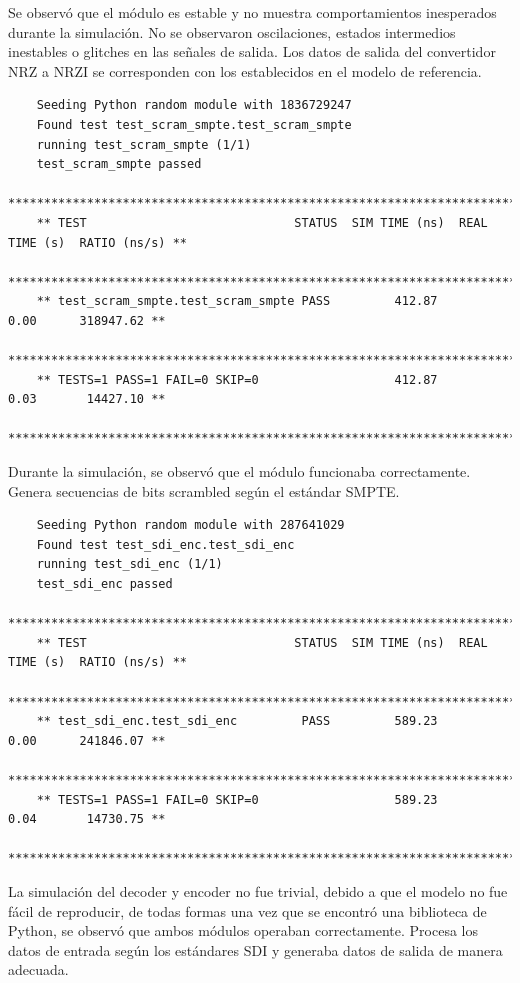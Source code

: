   Se observó que el módulo es estable y no muestra comportamientos inesperados
  durante la simulación. No se observaron oscilaciones, estados intermedios
  inestables o glitches en las señales de salida. Los datos de salida del
  convertidor NRZ a NRZI se corresponden con los establecidos en el modelo de
  referencia.

  {\scriptsize\begin{verbatim}
    Seeding Python random module with 1836729247
    Found test test_scram_smpte.test_scram_smpte
    running test_scram_smpte (1/1)
    test_scram_smpte passed
    *****************************************************************************************
    ** TEST                             STATUS  SIM TIME (ns)  REAL TIME (s)  RATIO (ns/s) **
    *****************************************************************************************
    ** test_scram_smpte.test_scram_smpte PASS         412.87           0.00      318947.62 **
    *****************************************************************************************
    ** TESTS=1 PASS=1 FAIL=0 SKIP=0                   412.87           0.03       14427.10 **
    *****************************************************************************************
  \end{verbatim}}

  Durante la simulación, se observó que el módulo funcionaba correctamente.
  Genera secuencias de bits scrambled según el estándar SMPTE\@.

  {\scriptsize\begin{verbatim}
    Seeding Python random module with 287641029
    Found test test_sdi_enc.test_sdi_enc
    running test_sdi_enc (1/1)
    test_sdi_enc passed
    *****************************************************************************************
    ** TEST                             STATUS  SIM TIME (ns)  REAL TIME (s)  RATIO (ns/s) **
    *****************************************************************************************
    ** test_sdi_enc.test_sdi_enc         PASS         589.23           0.00      241846.07 **
    *****************************************************************************************
    ** TESTS=1 PASS=1 FAIL=0 SKIP=0                   589.23           0.04       14730.75 **
    *****************************************************************************************
  \end{verbatim}}

  La simulación del decoder y encoder no fue trivial, debido a que el modelo
  no fue fácil de reproducir, de todas formas una vez que se encontró una
  biblioteca de Python, se observó que ambos módulos operaban correctamente.
  Procesa los datos de entrada según los estándares SDI y generaba datos
  de salida de manera adecuada.

